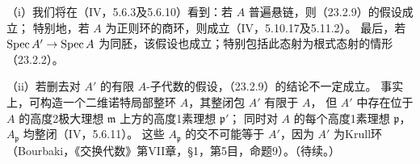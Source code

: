 （i）我们将在（IV，5.6.3及5.6.10）看到：若 $A$ 普遍悬链，则（23.2.9）的假设成立；
特别地，若 $A$ 为正则环的商环，则成立（IV，5.10.17及5.11.2）。
最后，若 $\operatorname{Spec} A'\to\operatorname{Spec} A$ 为同胚，该假设也成立；特别包括此态射为根式态射的情形（23.2.2）。

（ii）若删去对 $A'$ 的有限 $A$-子代数的假设，（23.2.9）的结论不一定成立。
事实上，可构造一个二维诺特局部整环 $A$，其整闭包 $A'$ 有限于 $A$，
但 $A'$ 中存在位于 $A$ 的高度2极大理想 $\mathfrak m$ 上方的高度1素理想 $\mathfrak p'$；
同时对 $A$ 的每个高度1素理想 $\mathfrak p$，$A_{\mathfrak p}$ 均整闭（IV，5.6.11）。
这些 $A_{\mathfrak p}$ 的交不可能等于 $A'$，因为 $A'$ 为Krull环
（Bourbaki，《交换代数》第VII章，\S1，第5目，命题9）。\hfill（待续。）\par
